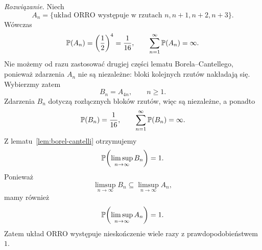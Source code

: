 \noindent\emph{Rozwiązanie.}
Niech
\[
  A_n=\{\text{układ ORRO występuje w rzutach }n,n+1,n+2,n+3\}.
\]
Wówczas
\[
  \mathbb{P}(A_n)=\left(\frac12\right)^4=\frac1{16},
  \qquad \sum_{n=1}^{\infty}\mathbb{P}(A_n)=\infty.
\]
Nie możemy od razu zastosować drugiej części lematu
Borela--Cantellego, ponieważ zdarzenia $A_n$ nie są niezależne:
bloki kolejnych rzutów nakładają się. Wybierzmy zatem
\[
  B_n=A_{4n},\qquad n\geq1.
\]
Zdarzenia $B_n$ dotyczą rozłącznych bloków rzutów, więc są niezależne,
a ponadto
\[
  \mathbb{P}(B_n)=\frac1{16},
  \qquad \sum_{n=1}^{\infty}\mathbb{P}(B_n)=\infty.
\]
Z lematu~\ref{lem:borel-cantelli} otrzymujemy
\[
  \mathbb{P}\!\left(\limsup_{n\to\infty}B_n\right)=1.
\]
Ponieważ
\[
  \limsup_{n\to\infty}B_n\subseteq\limsup_{n\to\infty}A_n,
\]
mamy również
\[
  \mathbb{P}\!\left(\limsup_{n\to\infty}A_n\right)=1.
\]
Zatem układ ORRO występuje nieskończenie wiele razy z prawdopodobieństwem~$1$.
